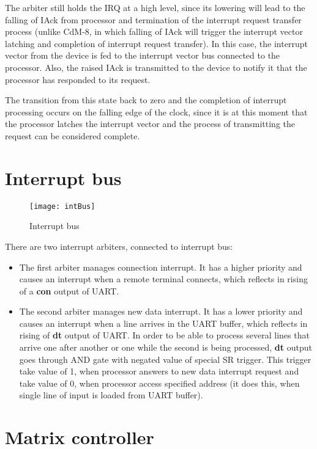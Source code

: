 \begin{enumerate}
		The arbiter still holds the IRQ at a high level, since its lowering will lead to the falling of IAck from processor and termination of the interrupt request transfer process (unlike CdM-8, in which falling of IAck will trigger the interrupt vector latching and completion of interrupt request transfer). In this case, the interrupt vector from the device is fed to the interrupt vector bus connected to the processor. Also, the raised IAck is transmitted to the device to notify it that the processor has responded to its request.

		The transition from this state back to zero and the completion of interrupt processing occurs on the falling edge of the clock, since it is at this moment that the processor latches the interrupt vector and the process of transmitting the request can be considered complete.
\end{enumerate}

\section*{Interrupt bus}

\begin{figure}[ht]
	\centering
	\texttt{[image: intBus]}
	\caption{Interrupt bus}
\end{figure}

There are two interrupt arbiters, connected to interrupt bus:

\begin{itemize}
	\item The first arbiter manages connection interrupt. It has a higher priority and causes an interrupt when a remote terminal connects, which reflects in rising of a \textbf{con} output of UART.
	\item The second arbiter manages new data interrupt. It has a lower priority and causes an interrupt when a line arrives in the UART buffer, which reflects in rising of \textbf{dt} output of UART. In order to be able to process several lines that arrive one after another or one while the second is being processed, \textbf{dt} output goes through AND gate with negated value of special SR trigger. This trigger take value of 1, when processor answers to new data interrupt request and take value of 0, when processor access specified address (it does this, when single line of input is loaded from UART buffer).
\end{itemize}

\section*{Matrix controller}


